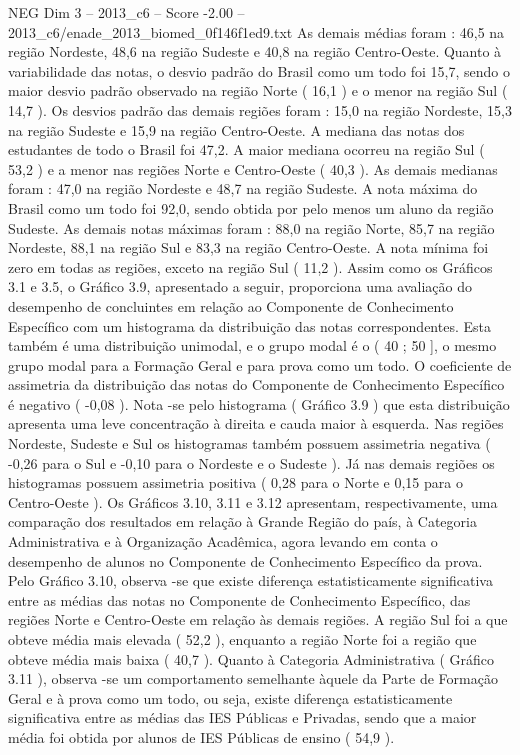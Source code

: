 \begin{textsample}{NEG Dim 3 – 2013\_c6 – Score -2.00 – 2013\_c6/enade\_2013\_biomed\_0f146f1ed9.txt}
As demais médias foram : 46,5 na região Nordeste, 48,6 na região Sudeste e 40,8 na região Centro-Oeste.
Quanto à variabilidade das notas, o desvio padrão do Brasil como um todo foi 15,7, sendo o maior desvio padrão observado na região Norte ( 16,1 ) e o menor na região Sul ( 14,7 ).
Os desvios padrão das demais regiões foram : 15,0 na região Nordeste, 15,3 na região Sudeste e 15,9 na região Centro-Oeste.
A mediana das notas dos estudantes de todo o Brasil foi 47,2.
A maior mediana ocorreu na região Sul ( 53,2 ) e a menor nas regiões Norte e Centro-Oeste ( 40,3 ).
As demais medianas foram : 47,0 na região Nordeste e 48,7 na região Sudeste.
A nota máxima do Brasil como um todo foi 92,0, sendo obtida por pelo menos um aluno da região Sudeste.
As demais notas máximas foram : 88,0 na região Norte, 85,7 na região Nordeste, 88,1 na região Sul e 83,3 na região Centro-Oeste.
A nota mínima foi zero em todas as regiões, exceto na região Sul ( 11,2 ).
Assim como os Gráficos 3.1 e 3.5, o Gráfico 3.9, apresentado a seguir, proporciona uma avaliação do desempenho de concluintes em relação ao Componente de Conhecimento Específico com um histograma da distribuição das notas correspondentes.
Esta também é uma distribuição unimodal, e o grupo modal é o ( 40 ; 50 ], o mesmo grupo modal para a Formação Geral e para prova como um todo.
O coeficiente de assimetria da distribuição das notas do Componente de Conhecimento Específico é negativo ( -0,08 ).
Nota -se pelo histograma ( Gráfico 3.9 ) que esta distribuição apresenta uma leve concentração à direita e cauda maior à esquerda.
Nas regiões Nordeste, Sudeste e Sul os histogramas também possuem assimetria negativa ( -0,26 para o Sul e -0,10 para o Nordeste e o Sudeste ).
Já nas demais regiões os histogramas possuem assimetria positiva ( 0,28 para o Norte e 0,15 para o Centro-Oeste ).
Os Gráficos 3.10, 3.11 e 3.12 apresentam, respectivamente, uma comparação dos resultados em relação à Grande Região do país, à Categoria Administrativa e à Organização Acadêmica, agora levando em conta o desempenho de alunos no Componente de Conhecimento Específico da prova.
Pelo Gráfico 3.10, observa -se que existe diferença estatisticamente significativa entre as médias das notas no Componente de Conhecimento Específico, das regiões Norte e Centro-Oeste em relação às demais regiões.
A região Sul foi a que obteve média mais elevada ( 52,2 ), enquanto a região Norte foi a região que obteve média mais baixa ( 40,7 ).
Quanto à Categoria Administrativa ( Gráfico 3.11 ), observa -se um comportamento semelhante àquele da Parte de Formação Geral e à prova como um todo, ou seja, existe diferença estatisticamente significativa entre as médias das IES Públicas e Privadas, sendo que a maior média foi obtida por alunos de IES Públicas de ensino ( 54,9 ).

\end{textsample}
